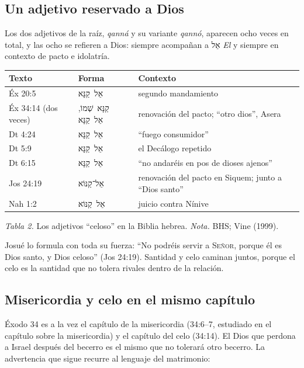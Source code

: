 \documentclass[11pt,letterpaper]{article}
\newcommand{\heb}[1]{\mbox{\foreignlanguage{hebrew}{#1}}}
\newcommand{\SENOR}{\textsc{Señor}}
\begin{document}
\subsection{Un adjetivo reservado a Dios}
Los dos adjetivos de la raíz, \emph{qanná} y su variante \emph{qannó}, aparecen ocho veces en total, y las ocho se refieren a Dios: siempre acompañan a \heb{אֵל} \emph{El} y siempre en contexto de pacto e idolatría.

\begin{center}\small\renewcommand{\arraystretch}{1.15}
\begin{tabular}{@{}L{2.4cm}L{2.6cm}L{8.6cm}@{}}
\toprule
\textbf{Texto} & \textbf{Forma} & \textbf{Contexto} \\ \midrule
Éx 20:5 & \heb{אֵל קַנָּא} & segundo mandamiento \\
Éx 34:14 (dos veces) & \heb{קַנָּא שְׁמוֹ}, \heb{אֵל קַנָּא} & renovación del pacto; ``otro dios'', Asera \\
Dt 4:24 & \heb{אֵל קַנָּא} & ``fuego consumidor'' \\
Dt 5:9 & \heb{אֵל קַנָּא} & el Decálogo repetido \\
Dt 6:15 & \heb{אֵל קַנָּא} & ``no andaréis en pos de dioses ajenos'' \\
Jos 24:19 & \heb{אֵל־קַנּוֹא} & renovación del pacto en Siquem; junto a ``Dios santo'' \\
Nah 1:2 & \heb{אֵל קַנּוֹא} & juicio contra Nínive \\
\bottomrule
\end{tabular}\par
{\footnotesize\color{gris}\textit{Tabla 2.} Los adjetivos ``celoso'' en la Biblia hebrea. \textit{Nota.} BHS; Vine (1999).}
\end{center}

Josué lo formula con toda su fuerza: ``No podréis servir a \SENOR, porque él es Dios santo, y Dios celoso'' (Jos 24:19). Santidad y celo caminan juntos, porque el celo es la santidad que no tolera rivales dentro de la relación.

\subsection{Misericordia y celo en el mismo capítulo}
Éxodo 34 es a la vez el capítulo de la misericordia (34:6--7, estudiado en el capítulo sobre la misericordia) y el capítulo del celo (34:14). El Dios que perdona a Israel después del becerro es el mismo que no tolerará otro becerro. La advertencia que sigue recurre al lenguaje del matrimonio:
\end{document}
